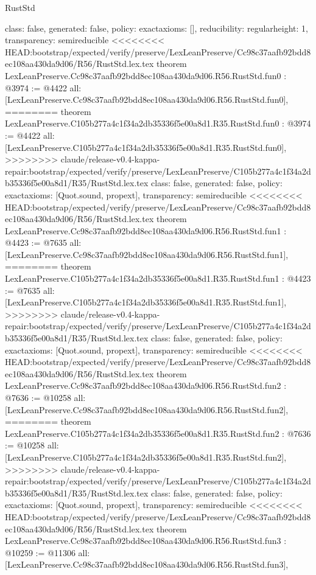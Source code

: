 \begin{lexlean}{RustStd}
\begin{coremodule}
{\begin{coremodule}
{{{  class: false,
  generated: false,
  policy: exact{axioms: []},
  reducibility: regular{height: 1},
  transparency: semireducible
}
<<<<<<<< HEAD:bootstrap/expected/verify/preserve/LexLeanPreserve/Cc98c37aafb92bdd8ec108aa430da9d06/R56/RustStd.lex.tex
theorem LexLeanPreserve.Cc98c37aafb92bdd8ec108aa430da9d06.R56.RustStd.fun0 : @3974 := @4422 {
  all: [LexLeanPreserve.Cc98c37aafb92bdd8ec108aa430da9d06.R56.RustStd.fun0],
========
theorem LexLeanPreserve.C105b277a4c1f34a2db35336f5e00a8d1.R35.RustStd.fun0 : @3974 := @4422 {
  all: [LexLeanPreserve.C105b277a4c1f34a2db35336f5e00a8d1.R35.RustStd.fun0],
>>>>>>>> claude/release-v0.4-kappa-repair:bootstrap/expected/verify/preserve/LexLeanPreserve/C105b277a4c1f34a2db35336f5e00a8d1/R35/RustStd.lex.tex
  class: false,
  generated: false,
  policy: exact{axioms: [Quot.sound, propext]},
  transparency: semireducible
}
<<<<<<<< HEAD:bootstrap/expected/verify/preserve/LexLeanPreserve/Cc98c37aafb92bdd8ec108aa430da9d06/R56/RustStd.lex.tex
theorem LexLeanPreserve.Cc98c37aafb92bdd8ec108aa430da9d06.R56.RustStd.fun1 : @4423 := @7635 {
  all: [LexLeanPreserve.Cc98c37aafb92bdd8ec108aa430da9d06.R56.RustStd.fun1],
========
theorem LexLeanPreserve.C105b277a4c1f34a2db35336f5e00a8d1.R35.RustStd.fun1 : @4423 := @7635 {
  all: [LexLeanPreserve.C105b277a4c1f34a2db35336f5e00a8d1.R35.RustStd.fun1],
>>>>>>>> claude/release-v0.4-kappa-repair:bootstrap/expected/verify/preserve/LexLeanPreserve/C105b277a4c1f34a2db35336f5e00a8d1/R35/RustStd.lex.tex
  class: false,
  generated: false,
  policy: exact{axioms: [Quot.sound, propext]},
  transparency: semireducible
}
<<<<<<<< HEAD:bootstrap/expected/verify/preserve/LexLeanPreserve/Cc98c37aafb92bdd8ec108aa430da9d06/R56/RustStd.lex.tex
theorem LexLeanPreserve.Cc98c37aafb92bdd8ec108aa430da9d06.R56.RustStd.fun2 : @7636 := @10258 {
  all: [LexLeanPreserve.Cc98c37aafb92bdd8ec108aa430da9d06.R56.RustStd.fun2],
========
theorem LexLeanPreserve.C105b277a4c1f34a2db35336f5e00a8d1.R35.RustStd.fun2 : @7636 := @10258 {
  all: [LexLeanPreserve.C105b277a4c1f34a2db35336f5e00a8d1.R35.RustStd.fun2],
>>>>>>>> claude/release-v0.4-kappa-repair:bootstrap/expected/verify/preserve/LexLeanPreserve/C105b277a4c1f34a2db35336f5e00a8d1/R35/RustStd.lex.tex
  class: false,
  generated: false,
  policy: exact{axioms: [Quot.sound, propext]},
  transparency: semireducible
}
<<<<<<<< HEAD:bootstrap/expected/verify/preserve/LexLeanPreserve/Cc98c37aafb92bdd8ec108aa430da9d06/R56/RustStd.lex.tex
theorem LexLeanPreserve.Cc98c37aafb92bdd8ec108aa430da9d06.R56.RustStd.fun3 : @10259 := @11306 {
  all: [LexLeanPreserve.Cc98c37aafb92bdd8ec108aa430da9d06.R56.RustStd.fun3],
}}}}}}
\end{coremodule}}
\end{coremodule}
\end{lexlean}
